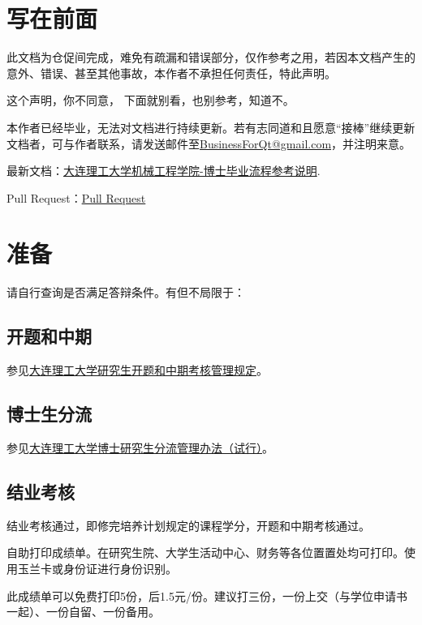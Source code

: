 \documentclass[12pt,a4paper]{ctexart}
\begin{document}
\clearpage{}
\section*{写在前面}
\label{sec:pre}

此文档为仓促间完成，难免有疏漏和错误部分，仅作参考之用，若因本文档产生的意外、错误、甚至其他事故，本作者不承担任何责任，特此声明。

这个声明，你不同意， 下面就别看，也别参考，知道不。

本作者已经毕业，无法对文档进行持续更新。若有志同道和且愿意“接棒”继续更新文档者，可与作者联系，请发送邮件至\href{mailto:BusinessForQt@gmail.com}{BusinessForQt@gmail.com}，并注明来意。

最新文档：\href{https://github.com/DrHanks91/DUTMePhDProcess}{大连理工大学机械工程学院-博士毕业流程参考说明}.

Pull Request：\href{https://github.com/DrHanks91/DUTMePhDProcess}{Pull Request}




\section{准备}
请自行查询是否满足答辩条件。有但不局限于：

\subsection{开题和中期}
\label{sec:kaiti}


参见\href{https://gs.dlut.edu.cn/info/1031/9635.htm}{大连理工大学研究生开题和中期考核管理规定}。

\subsection{博士生分流}
\label{sec:fenliu}

参见\href{https://gs.dlut.edu.cn/info/1079/8943.htm}{大连理工大学博士研究生分流管理办法（试行）}。

\subsection{结业考核}
\label{sec:jieye}

结业考核通过，即修完培养计划规定的课程学分，开题和中期考核通过。

自助打印成绩单。在研究生院、大学生活动中心、财务等各位置置处均可打印。使用玉兰卡或身份证进行身份识别。

此成绩单可以免费打印5份，后1.5元/份。建议打三份，一份上交（与学位申请书一起）、一份自留、一份备用。
\end{document}
